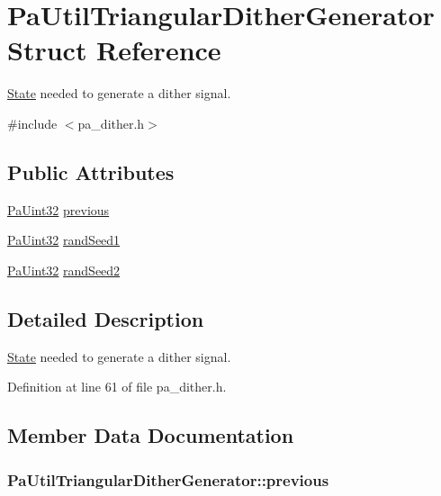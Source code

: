 \hypertarget{struct_pa_util_triangular_dither_generator}{}\section{Pa\+Util\+Triangular\+Dither\+Generator Struct Reference}
\label{struct_pa_util_triangular_dither_generator}


\hyperlink{struct_state}{State} needed to generate a dither signal.  




{\ttfamily \#include $<$pa\+\_\+dither.\+h$>$}

\subsection*{Public Attributes}
\begin{DoxyCompactItemize}
\item 
\hyperlink{pa__types_8h_a9cff423f720226e66a7826c30509c465}{Pa\+Uint32} \hyperlink{struct_pa_util_triangular_dither_generator_a4448ff52eda0652c282e21cef3400ef3}{previous}
\item 
\hyperlink{pa__types_8h_a9cff423f720226e66a7826c30509c465}{Pa\+Uint32} \hyperlink{struct_pa_util_triangular_dither_generator_a4826e30e892e0cab422fc936bc8d5d08}{rand\+Seed1}
\item 
\hyperlink{pa__types_8h_a9cff423f720226e66a7826c30509c465}{Pa\+Uint32} \hyperlink{struct_pa_util_triangular_dither_generator_af580b9d65bd8d8494e6b5200f9e535d1}{rand\+Seed2}
\end{DoxyCompactItemize}


\subsection{Detailed Description}
\hyperlink{struct_state}{State} needed to generate a dither signal. 

Definition at line 61 of file pa\+\_\+dither.\+h.



\subsection{Member Data Documentation}
\subsubsection[{\texorpdfstring{previous}{previous}}]{ Pa\+Util\+Triangular\+Dither\+Generator\+::previous}\hypertarget{struct_pa_util_triangular_dither_generator_a4448ff52eda0652c282e21cef3400ef3}{}\label{struct_pa_util_triangular_dither_generator_a4448ff52eda0652c282e21cef3400ef3}


